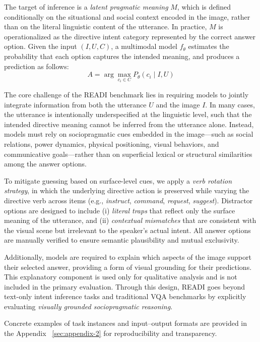 \documentclass[11pt]{article}
\begin{document}
The target of inference is a \textit{latent pragmatic meaning} $M$, which is defined conditionally on the situational and social context encoded in the image, rather than on the literal linguistic content of the utterance. In practice, $M$ is operationalized as the directive intent category represented by the correct answer option. Given the input $(I, U, C)$, a multimodal model $f_\theta$ estimates the probability that each option captures the intended meaning, and produces a prediction as follows:
\begin{equation*}
A = \arg\max_{c_i \in C} P_{\theta}(c_i \mid I, U)
\end{equation*}

The core challenge of the READI benchmark lies in requiring models to jointly integrate information from both the utterance $U$ and the image $I$. In many cases, the utterance is intentionally underspecified at the linguistic level, such that the intended directive meaning cannot be inferred from the utterance alone. Instead, models must rely on sociopragmatic cues embedded in the image—such as social relations, power dynamics, physical positioning, visual behaviors, and communicative goals—rather than on superficial lexical or structural similarities among the answer options.

To mitigate guessing based on surface-level cues, we apply a \textit{verb rotation strategy}, in which the underlying directive action is preserved while varying the directive verb across items (e.g., \textit{instruct}, \textit{command}, \textit{request}, \textit{suggest}). Distractor options are designed to include (i) \textit{literal traps} that reflect only the surface meaning of the utterance, and (ii) \textit{contextual mismatches} that are consistent with the visual scene but irrelevant to the speaker’s actual intent. All answer options are manually verified to ensure semantic plausibility and mutual exclusivity.

Additionally, models are required to explain which aspects of the image support their selected answer, providing a form of visual grounding for their predictions. This explanatory component is used only for qualitative analysis and is not included in the primary evaluation. Through this design, READI goes beyond text-only intent inference tasks and traditional VQA benchmarks by explicitly evaluating \textit{visually grounded sociopragmatic reasoning}.

Concrete examples of task instances and input--output formats are provided in the Appendix ~\ref{sec:appendix-2} for reproducibility and transparency.
\end{document}
